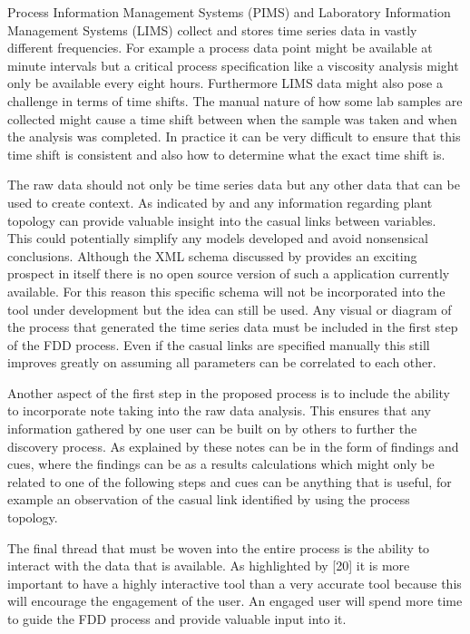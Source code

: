 Process Information Management Systems (PIMS) and Laboratory Information Management Systems (LIMS) collect and stores time series data in vastly different frequencies. For example a process data point might be available at minute intervals but a critical process specification like a viscosity analysis might only be available every eight hours. Furthermore LIMS data might also pose a challenge in terms of time shifts. The manual nature of how some lab samples are collected might cause a time shift between when the sample was taken and when the analysis was completed. In practice it can be very difficult to ensure that this time shift is consistent and also how to determine what the exact time shift is.

The raw data should not only be time series data but any other data that can be used to create context. As indicated by \cite{thornhill2007advances} and \cite{yim2006using} any information regarding plant topology can provide valuable insight into the casual links between variables. This could potentially simplify any models developed and avoid nonsensical conclusions. Although the XML schema discussed by  \cite{thornhill2007advances} provides an exciting prospect in itself there is no open source version of such a application currently available. For this reason this specific schema will not be incorporated into the tool under development but the idea can still be used. Any visual or diagram of the process that generated the time series data must be included in the first step of the FDD process. Even if the casual links are specified manually this still improves greatly on assuming all parameters can be correlated to each other. 

Another aspect of the first step in the proposed process is to include the ability to incorporate note taking into the raw data analysis. This ensures that any information gathered by one user can be built on by others to further the discovery process. As explained by \cite{mahyar2010closer} these notes can be in the form of findings and cues, where the findings can be as a results calculations which might only be related to one of the following steps and cues can be anything that is useful, for example an observation of the casual link identified by using the process topology.

The final thread that must be woven into the entire process is the ability to interact with the data that is available. As highlighted by [20] it is more important to have a highly interactive tool than a very accurate tool because this will encourage the engagement of the user. An engaged user will spend more time to guide the FDD process and provide valuable input into it.





